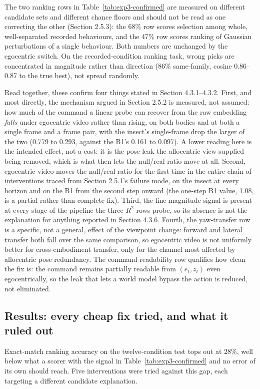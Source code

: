\documentclass[12pt,a4paper,oneside]{report}
\begin{document}
The two ranking rows in Table~\ref{tab:exp3-confirmed} are measured on different candidate sets and different
chance floors and should not be read as one correcting the other (Section 2.5.3): the 68\% row scores selection
among whole, well-separated recorded behaviours, and the 47\% row scores ranking of Gaussian perturbations of a
single behaviour. Both numbers are unchanged by the egocentric switch. On the recorded-condition ranking task,
wrong picks are concentrated in magnitude rather than direction (86\% same-family, cosine 0.86--0.87 to the true
best), not spread randomly.

Read together, these confirm four things stated in Section 4.3.1--4.3.2. First, and most directly, the mechanism
argued in Section 2.5.2 is measured, not assumed: how much of the command a linear probe can recover from the raw
embedding \emph{falls} under egocentric video rather than rising, on both bodies and at both a single frame and a
frame pair, with the insect's single-frame drop the larger of the two (0.779 to 0.293, against the B1's 0.161 to
0.097). A lower reading here is the intended effect, not a cost: it is the pose-leak the allocentric view supplied
being removed, which is what then lets the null/real ratio move at all. Second, egocentric video moves the
null/real ratio for the first time in the entire chain of interventions traced from Section 2.5.1's failure
mode, on the insect at every horizon and on the B1 from the second step onward (the one-step B1 value, 1.08,
is a partial rather than complete fix). Third, the fine-magnitude signal is present at every stage of the
pipeline the three $R^2$ rows probe, so its absence is not the explanation for anything reported in Section 4.3.6.
Fourth, the yaw-transfer row is a specific, not a general, effect of the viewpoint change: forward and lateral
transfer both fall over the same comparison, so egocentric video is not uniformly better for cross-embodiment
transfer, only for the channel most affected by allocentric pose redundancy. The command-readability row qualifies
how clean the fix is: the command remains partially readable from $(e_t, z_t)$ even egocentrically, so the leak
that lets a world model bypass the action is reduced, not eliminated.

\subsection{Results: every cheap fix tried, and what it ruled out}
Exact-match ranking accuracy on the twelve-condition test tops out at 28\%, well below what a scorer with the
signal in Table~\ref{tab:exp3-confirmed} and no error of its own should reach. Five interventions were tried
against this gap, each targeting a different candidate explanation.
\end{document}
